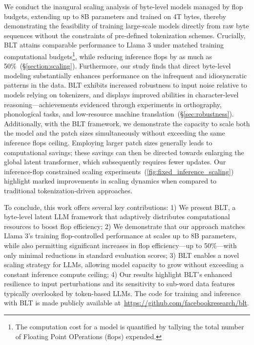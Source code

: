 We conduct the inaugural scaling analysis of byte-level models managed by flop budgets, extending up to 8B parameters and trained on 4T bytes, thereby demonstrating the feasibility of training large-scale models directly from raw byte sequences without the constraints of pre-defined tokenization schemes. Crucially, {\textsc BLT} attains comparable performance to Llama 3 under matched training computational budgets\footnote{The computation cost for a model is quantified by tallying the total number of Floating Point OPerations (flops) expended.}, while reducing inference flops by as much as 50\%~(\S\ref{section:scaling}). 
Furthermore, our study finds that direct byte-level modeling substantially enhances performance on the infrequent and idiosyncratic patterns in the data. {\textsc BLT} exhibits increased robustness to input noise relative to models relying on tokenizers, and displays improved abilities in character-level reasoning—achievements evidenced through experiments in orthography, phonological tasks, and low-resource machine translation~(\S\ref{sec:robustness}).
Additionally, with the {\textsc BLT} framework, we demonstrate the capacity to scale both the model and the patch sizes simultaneously without exceeding the same inference flops ceiling. Employing larger patch sizes generally leads to computational savings; these savings can then be directed towards enlarging the global latent transformer, which subsequently requires fewer updates. Our inference-flop constrained scaling experiments~(\autoref{fig:fixed_inference_scaling}) highlight marked improvements in scaling dynamics when compared to traditional tokenization-driven approaches.

To conclude, this work offers several key contributions: 1) We present {\textsc BLT}, a byte-level latent LLM framework that adaptively distributes computational resources to boost flop efficiency; 2) We demonstrate that our approach matches Llama 3’s training flop-controlled performance at scales up to 8B parameters, while also permitting significant increases in flop efficiency—up to 50\%—with only minimal reductions in standard evaluation scores; 3) {\textsc BLT} enables a novel scaling strategy for LLMs, allowing model capacity to grow without exceeding a constant inference compute ceiling; 4) Our results highlight {\textsc BLT}’s enhanced resilience to input perturbations and its sensitivity to sub-word data features typically overlooked by token-based LLMs. The code for training and inference with {\textsc BLT} is made publicly available at~\url{https://github.com/facebookresearch/blt}.

